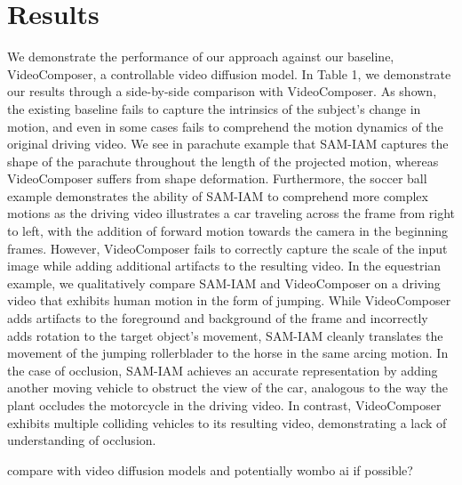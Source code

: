 \section{Results}

We demonstrate the performance of our approach against our baseline, VideoComposer, a controllable video diffusion model. In Table 1, we demonstrate our results through a side-by-side comparison with VideoComposer. As shown, the existing baseline fails to capture the intrinsics of the subject's change in motion, and even in some cases fails to comprehend the motion dynamics of the original driving video. We see in parachute example that SAM-IAM captures the shape of the parachute throughout the length of the projected motion, whereas VideoComposer suffers from shape deformation. Furthermore, the soccer ball example demonstrates the ability of SAM-IAM to comprehend more complex motions as the driving video illustrates a car traveling across the frame from right to left, with the addition of forward motion towards the camera in the beginning frames. However, VideoComposer fails to correctly capture the scale of the input image while adding additional artifacts to the resulting video.
In the equestrian example, we qualitatively compare SAM-IAM and VideoComposer on a driving video that exhibits human motion in the form of jumping. While VideoComposer adds artifacts to the foreground and background of the frame and incorrectly adds rotation to the target object's movement, SAM-IAM cleanly translates the movement of the jumping rollerblader to the horse in the same arcing motion.
In the case of occlusion, SAM-IAM achieves an accurate representation by adding another moving vehicle to obstruct the view of the car, analogous to the way the plant occludes the motorcycle in the driving video. In contrast, VideoComposer exhibits multiple colliding vehicles to its resulting video, demonstrating a lack of understanding of occlusion. 

compare with video diffusion models and potentially wombo ai if possible?

